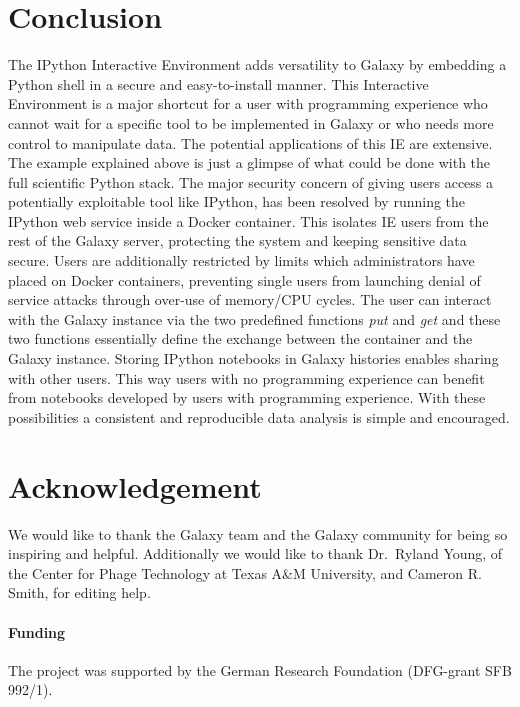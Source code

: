 \documentclass{bioinfo}
\begin{document}
\section{Conclusion}
The IPython Interactive Environment adds versatility to Galaxy by embedding a Python shell in a secure and easy-to-install manner.
This Interactive Environment is a major shortcut for a user with programming experience who cannot wait for a specific tool to
be implemented in Galaxy or who needs more control to manipulate data. The potential applications of this IE are extensive.
The example explained above is just a glimpse of what could be done with the full scientific Python stack.
The major security concern of giving users access a potentially exploitable tool like IPython, 
has been resolved by running the IPython web service inside a Docker container. This 
isolates IE users from the rest of the Galaxy server, protecting the system and keeping sensitive data secure.
Users are additionally restricted by limits which administrators have placed on Docker containers,
preventing single users from launching denial of service attacks through over-use of memory/CPU cycles.
The user can interact with the Galaxy instance via the two predefined functions \textit{put} and \textit{get} and these two
functions essentially define the exchange between the container and the Galaxy instance.
Storing IPython notebooks in Galaxy histories enables sharing with other users. 
This way users with no programming experience can benefit from notebooks developed by users with programming experience.
With these possibilities a consistent and reproducible data analysis is simple and encouraged. 


\section*{Acknowledgement}
We would like to thank the Galaxy team and the Galaxy community for being so inspiring and helpful. 
Additionally we would like to thank Dr.~Ryland Young, of the Center for Phage Technology at Texas A\&M University, 
and Cameron R. Smith, for editing help.


\paragraph{Funding\textcolon} The project was supported by the German Research Foundation (DFG-grant SFB 992/1).


%
%
%
%
%
%
%
%
\end{document}
